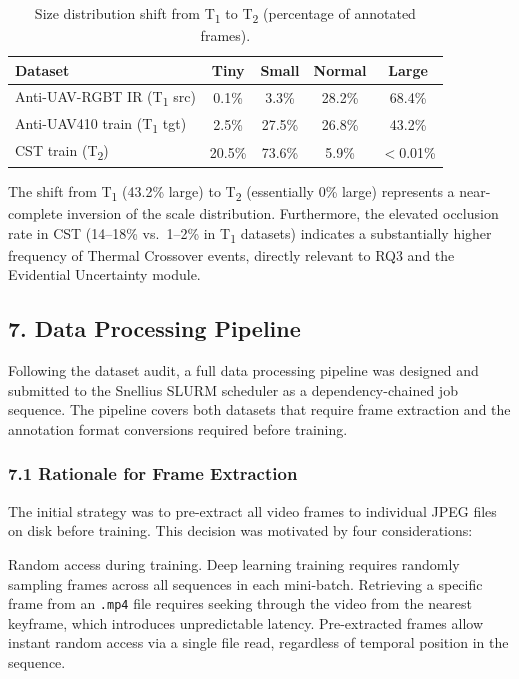 \begin{table}[h]
\centering
\caption{Size distribution shift from T\textsubscript{1} to
         T\textsubscript{2} (percentage of annotated frames).}
\label{tab:scale_shift}
\begin{tabular}{lcccc}
\hline
Dataset & Tiny & Small & Normal & Large \\
\hline
Anti-UAV-RGBT IR (T\textsubscript{1} src) & 0.1\% & 3.3\% & 28.2\% & 68.4\% \\
Anti-UAV410 train (T\textsubscript{1} tgt) & 2.5\% & 27.5\% & 26.8\% & 43.2\% \\
CST train (T\textsubscript{2})             & 20.5\% & 73.6\% & 5.9\% & $<$0.01\% \\
\hline
\end{tabular}
\end{table}

The shift from T\textsubscript{1} (43.2\% large) to T\textsubscript{2}
(essentially 0\% large) represents a near-complete inversion of the
scale distribution. Furthermore, the elevated occlusion rate in CST
(14--18\% vs.\ 1--2\% in T\textsubscript{1} datasets) indicates a
substantially higher frequency of Thermal Crossover events, directly
relevant to RQ3 and the Evidential Uncertainty module.

\subsection*{7. Data Processing Pipeline}

Following the dataset audit, a full data processing pipeline was
designed and submitted to the Snellius SLURM scheduler as a
dependency-chained job sequence. The pipeline covers both datasets
that require frame extraction and the annotation format conversions
required before training.

\subsubsection*{7.1 Rationale for Frame Extraction}

The initial strategy was to pre-extract all video frames to individual
JPEG files on disk before training. This decision was motivated by
four considerations:

Random access during training. Deep learning training requires
randomly sampling frames across all sequences in each mini-batch.
Retrieving a specific frame from an \texttt{.mp4} file requires
seeking through the video from the nearest keyframe, which introduces
unpredictable latency. Pre-extracted frames allow instant random
access via a single file read, regardless of temporal position in the
sequence.

